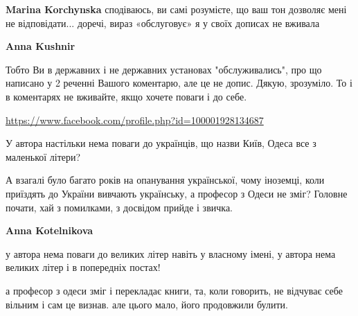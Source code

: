 \begin{itemize}
\begin{itemize}
 
\textbf{Marina Korchynska} сподіваюсь, ви самі розумієте, що ваш тон дозволяє мені не відповідати... доречі, вираз «обслуговує» я у своїх дописах не вживала

 
\textbf{Anna Kushnir} 

Тобто Ви в державних і не державних установах "обслуживались", про що написано
у 2 реченні Вашого коментарю, але це не допис. Дякую, зрозуміло. То і в
коментарях не вживайте, якщо хочете поваги і до себе.

\end{itemize}

\url{https://www.facebook.com/profile.php?id=100001928134687}\par
 

У автора настільки нема поваги до українців, що назви Київ, Одеса все з маленької літери?

А взагалі було багато років на опанування української, чому іноземці, коли
приїздять до України вивчають українську, а професор з Одеси не зміг? Головне
почати, хай з помилками, з досвідом прийде і звичка.

\begin{itemize}
 
\textbf{Anna Kotelnikova} 

у автора нема поваги до великих літер навіть у власному імені, у автора нема
великих літер і в попередніх постах!

а професор з одеси зміг і перекладає книги, та, коли говорить, не відчуває себе
вільним і сам це визнав. але цього мало, його продовжили булити.


\end{itemize}
\end{itemize}
